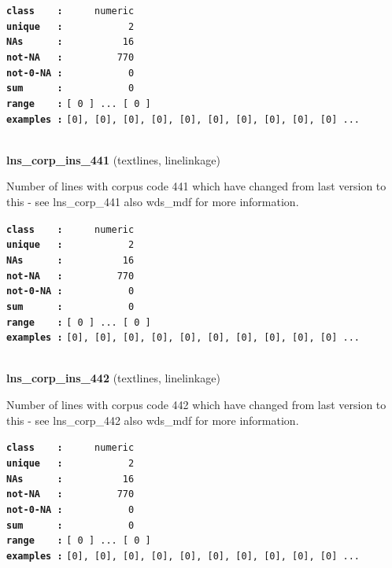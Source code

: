 \documentclass[]{article}
\begin{document}
\textbf{\texttt{class\ \ \ \ :}} \texttt{~~~~~numeric}\\
\textbf{\texttt{unique\ \ \ :}} \texttt{~~~~~~~~~~~2}\\
\textbf{\texttt{NAs\ \ \ \ \ \ :}} \texttt{~~~~~~~~~~16}\\
\textbf{\texttt{not-NA\ \ \ :}} \texttt{~~~~~~~~~770}\\
\textbf{\texttt{not-0-NA\ :}} \texttt{~~~~~~~~~~~0}\\
\textbf{\texttt{sum\ \ \ \ \ \ :}} \texttt{~~~~~~~~~~~0}\\
\textbf{\texttt{range\ \ \ \ :}}
\texttt{{[}\ 0\ {]}\ ...\ {[}\ 0\ {]}}\\
\textbf{\texttt{examples\ :}}
\texttt{{[}0{]},\ {[}0{]},\ {[}0{]},\ {[}0{]},\ {[}0{]},\ {[}0{]},\ {[}0{]},\ {[}0{]},\ {[}0{]},\ {[}0{]}\ ...}\\

~

\textbf{lns\_corp\_ins\_441} (textlines, linelinkage)

Number of lines with corpus code 441 which have changed from last
version to this - see lns\_corp\_441 also wds\_mdf for more information.

\textbf{\texttt{class\ \ \ \ :}} \texttt{~~~~~numeric}\\
\textbf{\texttt{unique\ \ \ :}} \texttt{~~~~~~~~~~~2}\\
\textbf{\texttt{NAs\ \ \ \ \ \ :}} \texttt{~~~~~~~~~~16}\\
\textbf{\texttt{not-NA\ \ \ :}} \texttt{~~~~~~~~~770}\\
\textbf{\texttt{not-0-NA\ :}} \texttt{~~~~~~~~~~~0}\\
\textbf{\texttt{sum\ \ \ \ \ \ :}} \texttt{~~~~~~~~~~~0}\\
\textbf{\texttt{range\ \ \ \ :}}
\texttt{{[}\ 0\ {]}\ ...\ {[}\ 0\ {]}}\\
\textbf{\texttt{examples\ :}}
\texttt{{[}0{]},\ {[}0{]},\ {[}0{]},\ {[}0{]},\ {[}0{]},\ {[}0{]},\ {[}0{]},\ {[}0{]},\ {[}0{]},\ {[}0{]}\ ...}\\

~

\textbf{lns\_corp\_ins\_442} (textlines, linelinkage)

Number of lines with corpus code 442 which have changed from last
version to this - see lns\_corp\_442 also wds\_mdf for more information.

\textbf{\texttt{class\ \ \ \ :}} \texttt{~~~~~numeric}\\
\textbf{\texttt{unique\ \ \ :}} \texttt{~~~~~~~~~~~2}\\
\textbf{\texttt{NAs\ \ \ \ \ \ :}} \texttt{~~~~~~~~~~16}\\
\textbf{\texttt{not-NA\ \ \ :}} \texttt{~~~~~~~~~770}\\
\textbf{\texttt{not-0-NA\ :}} \texttt{~~~~~~~~~~~0}\\
\textbf{\texttt{sum\ \ \ \ \ \ :}} \texttt{~~~~~~~~~~~0}\\
\textbf{\texttt{range\ \ \ \ :}}
\texttt{{[}\ 0\ {]}\ ...\ {[}\ 0\ {]}}\\
\textbf{\texttt{examples\ :}}
\texttt{{[}0{]},\ {[}0{]},\ {[}0{]},\ {[}0{]},\ {[}0{]},\ {[}0{]},\ {[}0{]},\ {[}0{]},\ {[}0{]},\ {[}0{]}\ ...}\\
\end{document}
